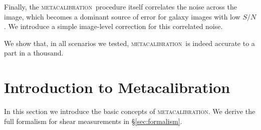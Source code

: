\documentclass[iop]{emulateapj}
\newcommand{\snr}{$S/N$}
\newcommand{\mcal}{\textsc{metacalibration}}
\begin{document}

Finally, the \mcal\ procedure itself correlates the noise across the image,
which becomes a dominant source of error for galaxy images with low \snr.  We
introduce a simple image-level correction for this correlated noise.

We show that, in all scenarios we tested, \mcal\ is indeed accurate to a part
in a thousand.

\section{Introduction to Metacalibration} \label{sec:mcal}

In this section we introduce the basic concepts of \mcal. We derive the full
formalism for shear measurements in \S \ref{sec:formalism}.
\end{document}
